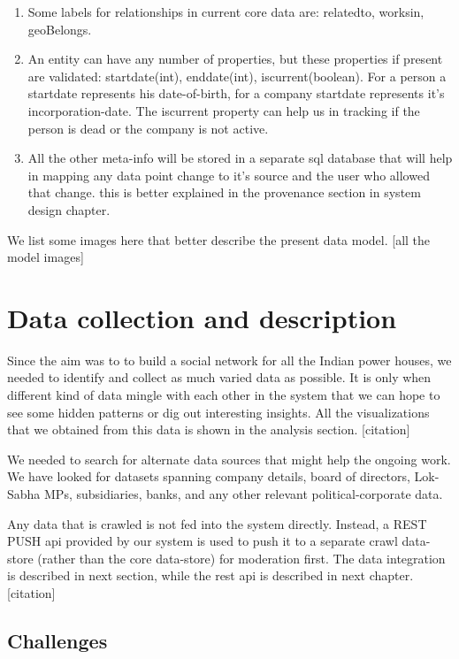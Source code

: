 \begin {enumerate}
\item  Some labels for relationships in current core data are: relatedto, worksin, geoBelongs.

\item An entity can have any number of properties, but these properties if present are validated: startdate(int), enddate(int), iscurrent(boolean). For a person a startdate represents his date-of-birth, for a company startdate represents it's incorporation-date. The iscurrent property can help us in tracking if the person is dead or the company is not active.

\item All the other meta-info will be stored in a separate sql database that will help in mapping any data point change to it’s source and the user who allowed that change. this is better explained in the provenance section in system design chapter.

\end{enumerate}

We list some images here that better describe the present data model. [all the model images]


\section{Data collection and description}

Since the aim was to to build a social network for all the Indian power houses, we needed to identify and collect as much varied data as possible. It is only when different kind of data mingle with each other in the system that we can hope to see some hidden patterns or dig out interesting insights. All the visualizations that we obtained from this data is shown in the analysis section. [citation]

We needed to search for alternate data sources that might help the ongoing work. We have looked for datasets spanning company details, board of directors, Lok-Sabha MPs, subsidiaries, banks, and any other relevant political-corporate data. 

Any data that is crawled is not fed into the system directly. Instead, a REST PUSH api provided by our system is used to push it to a separate crawl data-store (rather than the core data-store) for moderation first. The  data integration is described in next section, while the rest api is described in next chapter. [citation]

\subsection{Challenges}

